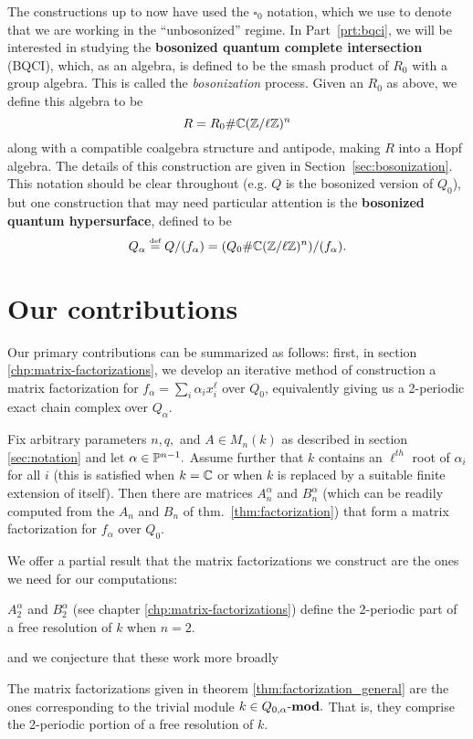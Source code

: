 \documentclass [11pt, proquest] {uwthesis}[2020/02/24]
\begin{document}
    The constructions up to now have used the $\square_0$ notation, which we use to denote that we are working in the ``unbosonized'' regime. In Part~\ref{prt:bqci}, we will be interested in studying the \textbf{bosonized quantum complete intersection} (BQCI), which, as an algebra, is defined to be the smash product of $R_0$ with a group algebra. This is called the \textit{bosonization} process. Given an $R_0$ as above, we define this algebra to be
    \[R = R_0 \# \mathbb{C}(\mathbb{Z}/\ell\mathbb{Z})^n\]
    along with a compatible coalgebra structure and antipode, making $R$ into a Hopf algebra. The details of this construction are given in Section~\ref{sec:bosonization}. This notation should be clear throughout (e.g. $Q$ is the bosonized version of $Q_0$), but one construction that may need particular attention is the \textbf{bosonized quantum hypersurface}, defined to be
    \[Q_\alpha\stackrel{\text{\tiny def}}{=} Q/(f_\alpha)=(Q_0\#\mathbb{C}(\mathbb{Z}/\ell\mathbb{Z})^n)/(f_\alpha).\]
    
\section{Our contributions}
    Our primary contributions can be summarized as follows: first, in section \ref{chp:matrix-factorizations}, we develop an iterative method of construction a matrix factorization for $f_\alpha=\sum_i\alpha_ix_i^\ell$ over $Q_0$, equivalently giving us a 2-periodic exact chain complex over $Q_\alpha.$ 
    \begingroup
    \def\thethm{2.16}
    \addtocounter{thm}{-1}
    \begin{thm}
        Fix arbitrary parameters $n,q,$ and $A\in M_n(k)$ as described in section \ref{sec:notation} and let $\alpha\in\mathbb{P}^{n-1}.$ Assume further that $k$ contains an $\ell^{th}$ root of $\alpha_i$ for all $i$ (this is satisfied when $k=\mathbb{C}$ or when $k$ is replaced by a suitable finite extension of itself). Then there are matrices $A_n^\alpha$ and $B_n^\alpha$ (which can be readily computed from the $A_n$ and $B_n$ of thm.~\ref{thm:factorization}) that form a matrix factorization for $f_\alpha$ over $Q_0$.    
    \end{thm}
    \endgroup
    
    We offer a partial result that the matrix factorizations we construct are the ones we need for our computations:
    \begingroup
    \def\thethm{2.19}
    \addtocounter{thm}{-1}
    \begin{lem}
        $A_2^\alpha$ and $B_2^\alpha$ (see chapter \ref{chp:matrix-factorizations}) define the 2-periodic part of a free resolution of $k$ when $n=2.$ 
    \end{lem}
    \endgroup
    and we conjecture that these work more broadly
    \begingroup
    \def\thethm{2.19}
    \addtocounter{thm}{-1}
    \begin{conj}
        The matrix factorizations given in theorem \ref{thm:factorization_general} are the ones corresponding to the trivial module $k\in Q_{0,\alpha}\text{-}\mathbf{mod}.$ That is, they comprise the 2-periodic portion of a free resolution of $k$.
    \end{conj}
    \endgroup
    
\end{document}
